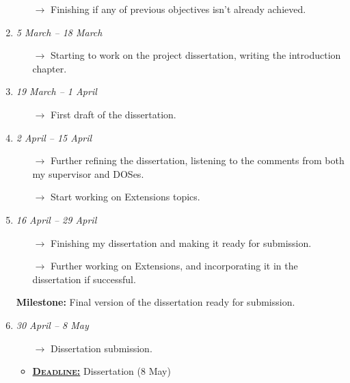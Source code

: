 \begin{enumerate}[label=\bf Part \arabic*:]
\begin{itemize}
            \item[$\rightarrow$] Finishing if any of previous objectives isn't already achieved.
        \end{itemize}
    \item \emph{5 March -- 18 March}
        \begin{itemize}
            \item[$\rightarrow$] Starting to work on the project dissertation, writing the introduction chapter.
        \end{itemize}
    \item \emph{19 March -- 1 April}
        \begin{itemize}
            \item[$\rightarrow$] First draft of the dissertation.
        \end{itemize}
        \item \emph{2 April -- 15 April}
        \begin{itemize}
            \item[$\rightarrow$] Further refining the dissertation, listening to the comments from both my supervisor and DOSes.
            \item[$\rightarrow$] Start working on Extensions topics.
        \end{itemize}
    \item \emph{16 April -- 29 April}
        \begin{itemize}
            \item[$\rightarrow$] Finishing my dissertation and making it ready for submission.
            \item[$\rightarrow$] Further working on Extensions, and incorporating it in the dissertation if successful.
        \end{itemize}
        \textbf{Milestone:} Final version of the dissertation ready for submission.
    \item \emph{30 April -- 8 May}
        \begin{itemize}
            \item[$\rightarrow$] Dissertation submission.
            \item\underline{\textbf{\textsc{Deadline:}}} Dissertation (8 May)
        \end{itemize}
\end{enumerate}
